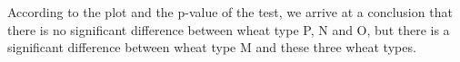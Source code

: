 \documentclass[letterpaper,11pt]{article}
\begin{document}
\begin{center} 
\end{center}

According to the plot and the p-value of the test, we arrive at a conclusion that there is no significant difference between wheat type P, N and O, but there is a significant difference between wheat type M and these three wheat types.
\end{document}
